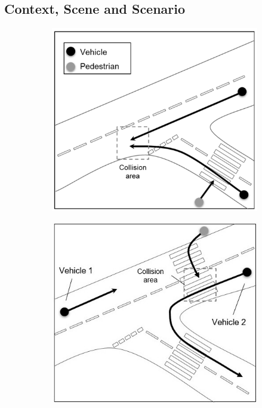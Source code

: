 \subsection{Context, Scene and Scenario}\label{TestsDescriptionAndTechnicalities}
\begin{figure}[!t]
    \centering
    \begin{subfigure}{.24\textwidth}
        \includegraphics[width=1\textwidth]{../other/figures/det_fig3a}
        \caption{}
        \label{Test_a}
    \end{subfigure}
    \begin{subfigure}{.24\textwidth}
        \includegraphics[width=1\textwidth]{../other/figures/det_fig3bb}

\end{subfigure}
\end{figure}
